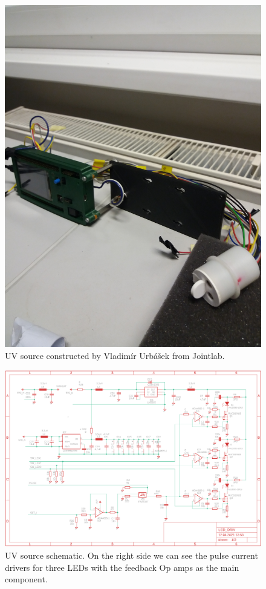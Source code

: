  \begin{figure}[H]
 \centering
 \includegraphics[scale=0.09, angle = 270, origin = c]{./pictures/KarlsRuhe}
 \caption{UV source constructed by Vladimír Urbášek from Jointlab.}
 \label{UVsource}
\end{figure}

 \begin{figure}[H]
 \centering
 \includegraphics[scale=0.5, angle = 0, origin = c]{./pictures/OrigScheme.png}
 \caption{UV source schematic. On the right side we can see the pulse current drivers for three LEDs with the feedback Op amps as the main component.}
 \label{UVsource}
\end{figure}


